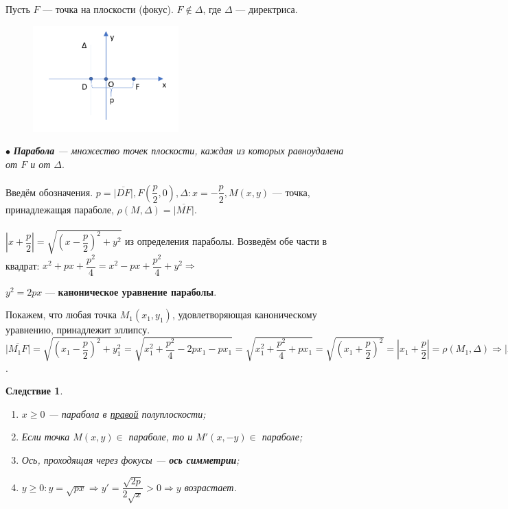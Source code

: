 \documentclass[a4paper, 12pt]{report}
\begin{document}
Пусть $F$ --- точка на плоскости (фокус). $F \notin \Delta$, где $\Delta$ --- директриса.\\
\begin{figure}
	\includegraphics[width=0.5\textwidth]{Парабола_1.PNG}
	\label{ris:image}
\end{figure}
$\bullet$ \textit{\textbf{Парабола} --- множество точек плоскости, каждая из которых равноудалена от $F$ и от $\Delta$}.\\\\
Введём обозначения. $p = \overline{|DF|}, F(\dfrac{p}{2}, 0), \Delta: x = -\dfrac{p}{2}, M(x, y)$ --- точка, принадлежащая параболе, $\rho(M, \Delta) = \overline{|MF|}$.\\\\
$|x + \dfrac{p}{2}| = \sqrt{(x - \dfrac{p}{2})^2+y^2}$ из определения параболы. Возведём обе части в квадрат: $x^2 + px + \dfrac{p^2}{4} = x^2 - px + \dfrac{p^2}{4} + y^2 \Rightarrow$ \begin{center}
	$y^2 = 2px$ --- \textbf{каноническое уравнение параболы}.
\end{center}
Покажем, что любая точка $M_1(x_1, y_1)$, удовлетворяющая каноническому уравнению, принадлежит эллипсу.\\ $\overline{|M_1F|} = \sqrt{(x_1 - \dfrac{p}{2})^2 + y_1^2} = \sqrt{x_1^2 + \dfrac{p^2}{4} - 2px_1 - px_1} = \sqrt{x_1^2 + \dfrac{p^2}{4} + px_1} = \sqrt{(x_1 + \dfrac{p}{2})^2} = |x_1 + \dfrac{p}{2}| = \rho(M_1, \Delta) \Rightarrow \overline{|M_1F|} = \rho(M_1, \Delta)$.
\newtheorem*{cor19}{Следствие}\begin{cor19}
	\begin{enumerate}
		\item  $x \geqslant 0$ --- парабола в \underline{правой} полуплоскости;
		\item Если точка $M(x, y) \in$ параболе, то и $M'(x, -y) \in$ параболе;
		\item Ось, проходящая через фокусы --- \textbf{ось симметрии};
		\item $y \geqslant 0: y = \sqrt{px} \Rightarrow y' = \dfrac{\sqrt{2p}}{2\sqrt{x}} > 0 \Rightarrow y$ возрастает.
	\end{enumerate}
\end{cor19}
\end{document}
